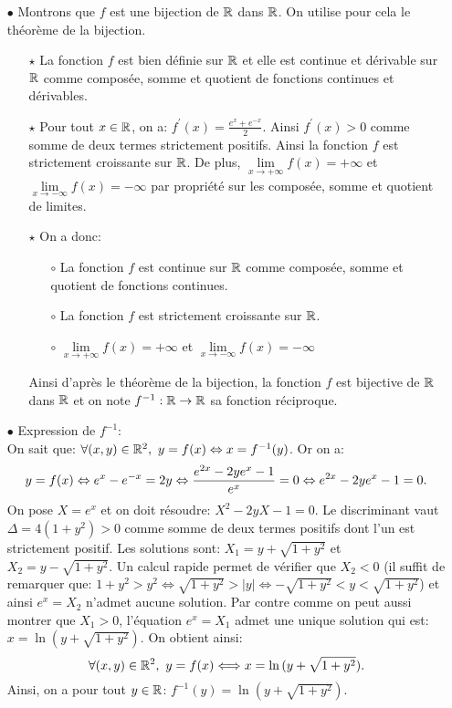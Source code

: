 \documentclass[a4paper, 11pt,reqno]{article}
\begin{document}
\begin{correction}
\begin{itemize} 
\item[$\bullet$] Montrons que $f$ est une bijection de $\mathbb{R}$ dans $\mathbb{R}$. On utilise pour cela le th\'eor\`{e}me de la bijection.
\begin{itemize}
\item[$\star$] La fonction $f$ est bien d\'efinie sur $\mathbb{R}$ et elle est continue et d\'erivable sur $\mathbb{R}$ comme compos\'ee, somme et quotient de fonctions continues et d\'erivables.
\item[$\star$] Pour tout $x\in\mathbb{R}$, on a: $f^{\prime}(x)=\frac{e^x+e^{-x}}{2}$. Ainsi $f^{\prime}(x)>0$ comme somme de deux termes strictement positifs. Ainsi la fonction $f$ est strictement croissante sur $\mathbb{R}$. De plus, $\lim\limits_{x\to +\infty} f(x)=+\infty$ et $\lim\limits_{x\to -\infty} f(x)=-\infty$ par propri\'et\'e sur les compos\'ee, somme et quotient de limites.
\item[$\star$] On a donc:
\begin{itemize}
\item[$\circ$] La fonction $f$ est continue sur $\mathbb{R}$ comme compos\'ee, somme et quotient de fonctions continues.
\item[$\circ$] La fonction $f$ est strictement croissante sur $\mathbb{R}$.
\item[$\circ$] $\lim\limits_{x\to +\infty} f(x)=+\infty$ et $\lim\limits_{x\to -\infty} f(x)=-\infty$
\end{itemize}
Ainsi d'apr\`{e}s le th\'eor\`{e}me de la bijection, la fonction $f$ est bijective de $\mathbb{R}$ dans $\mathbb{R}$ et on note $f^{-1}: \mathbb{R}\rightarrow \mathbb{R}$ sa fonction r\'eciproque.
\end{itemize}
\item[$\bullet$] Expression de $f^{-1}$:\\
\noindent On sait que: $\forall (x,y)\in\R^2,\ y=f(x)\Leftrightarrow x=f^{-1}(y)$. Or on a:
$$y=f(x)\Leftrightarrow e^x-e^{-x}=2y\Leftrightarrow \displaystyle\frac{e^{2x} -2ye^x-1  }{e^x}=0\Leftrightarrow e^{2x} -2ye^x-1=0.$$
On pose $X=e^x$ et on doit r\'esoudre: $X^2-2yX-1=0$. Le discriminant vaut $\Delta=4(1+y^2)>0$ comme somme de deux termes positifs dont l'un est strictement positif. Les solutions sont: $X_1=y+\sqrt{1+y^2}$ et $X_2=y-\sqrt{1+y^2}$. Un calcul rapide permet de v\'erifier que $X_2<0$ (il suffit de remarquer que: $1+y^2>y^2\Leftrightarrow \sqrt{1+y^2}>|y|\Leftrightarrow -\sqrt{1+y^2}<y<\sqrt{1+y^2}$) et ainsi $e^x=X_2$ n'admet aucune solution. Par contre comme on peut aussi montrer que $X_1>0$, l'\'equation $e^x=X_1$ admet une unique solution qui est: $x=\ln{(y+\sqrt{1+y^2})}$. On obtient ainsi:
$$\forall (x,y)\in\R^2,\ y=f(x)\Longleftrightarrow x=\ln{(y+\sqrt{1+y^2})}.$$
Ainsi, on a pour tout $y\in\mathbb{R}$: $f^{-1}(y)=\ln{(y+\sqrt{1+y^2})}$.
\end{itemize}
\end{correction}
\end{document}
